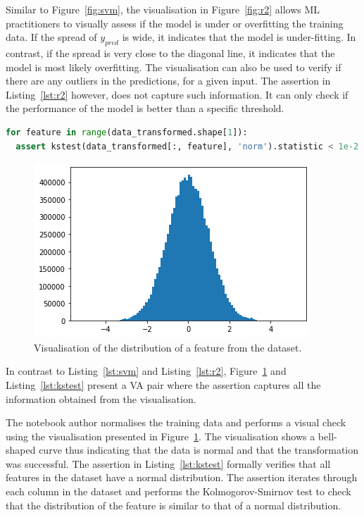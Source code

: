 \documentclass[conference]{IEEEtran}
\begin{document}
Similar to Figure~\ref{fig:svm}, the visualisation in Figure~\ref{fig:r2} allows ML practitioners to visually assess if the model is under or overfitting the training data. If the spread of $y_{pred}$ is wide, it indicates that the model is under-fitting. In contrast, if the spread is very close to the diagonal line, it indicates that the model is most likely overfitting. The visualisation can also be used to verify if there are any outliers in the predictions, for a given input. The assertion in Listing~\ref{lst:r2} however, does not capture such information. It can only check if the performance of the model is better than a specific threshold.

\begin{lstlisting}[language=Python, caption={Assertion to check that each feature in a dataset is normal using the Kolmogorov-Smirnov test for goodness of fit from the scipy library.}, label={lst:kstest}]
for feature in range(data_transformed.shape[1]):
  assert kstest(data_transformed[:, feature], 'norm').statistic < 1e-2
\end{lstlisting}

\begin{figure}
  \includegraphics[width=\linewidth]{../catalogue/select-152a.png}
  \caption{Visualisation of the distribution of a feature from the dataset.}\label{fig:kstest}
\end{figure}

In contrast to Listing~\ref{lst:svm} and Listing~\ref{lst:r2}, Figure~\ref{fig:kstest} and Listing~\ref{lst:kstest} present a VA pair where the assertion captures all the information obtained from the visualisation.

The notebook author normalises the training data and performs a visual check using the visualisation presented in Figure~\ref{fig:kstest}. The visualisation shows a bell-shaped curve thus indicating that the data is normal and that the transformation was successful. The assertion in Listing~\ref{lst:kstest} formally verifies that all features in the dataset have a normal distribution. The assertion iterates through each column in the dataset and performs the Kolmogorov-Smirnov test to check that the distribution of the feature is similar to that of a normal distribution.
\end{document}
